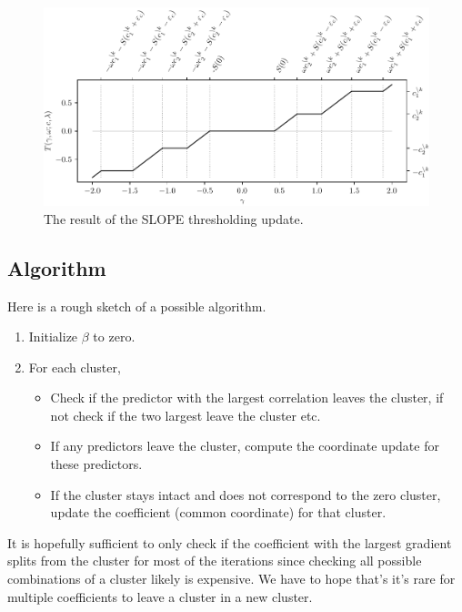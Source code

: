\begin{figure}[htbp]
  \centering
  \includegraphics[]{figures/slope-thresholding.pdf}
  \caption{The result of the SLOPE thresholding update.}
  \label{fig:slope-thresholding}
\end{figure}

\subsection{Algorithm}

Here is a rough sketch of a possible algorithm.
\begin{enumerate}
  \item Initialize \(\beta\) to zero.
  \item For each cluster,
        \begin{itemize}
          \item Check if the predictor with the largest correlation leaves the
                cluster, if not check if the two largest leave the cluster etc.
          \item If any predictors leave the cluster, compute the coordinate
                update for these predictors.
          \item If the cluster stays intact and does not correspond to the
                zero cluster, update the coefficient (common coordinate) for that
                cluster.
        \end{itemize}
\end{enumerate}
It is hopefully sufficient to only check if the coefficient with the
largest gradient splits from the cluster for most of the iterations since
checking all possible combinations of a cluster likely is expensive.
We have
to hope that's it's rare for multiple coefficients to leave a cluster in
a new cluster.
